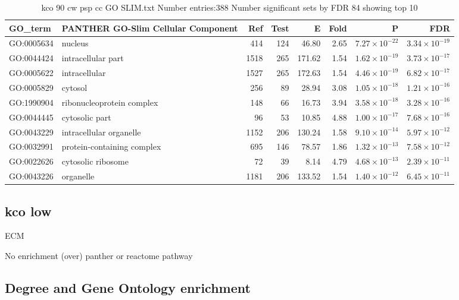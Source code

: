 \begin{table}[ht]
\centering
\begin{tabular}{llrrrrrr}
  \hline
GO\_term & PANTHER GO-Slim Cellular Component & Ref & Test & E & Fold & P & FDR \\ 
  \hline
GO:0005634 & nucleus  & 414 & 124 & 46.80 & 2.65 & $7.27 \times 10^{-22}$ & $3.34 \times 10^{-19}$ \\ 
  GO:0044424 & intracellular part  & 1518 & 265 & 171.62 & 1.54 & $1.62 \times 10^{-19}$ & $3.73 \times 10^{-17}$ \\ 
  GO:0005622 & intracellular  & 1527 & 265 & 172.63 & 1.54 & $4.46 \times 10^{-19}$ & $6.82 \times 10^{-17}$ \\ 
  GO:0005829 & cytosol  & 256 & 89 & 28.94 & 3.08 & $1.05 \times 10^{-18}$ & $1.21 \times 10^{-16}$ \\ 
  GO:1990904 & ribonucleoprotein complex  & 148 & 66 & 16.73 & 3.94 & $3.58 \times 10^{-18}$ & $3.28 \times 10^{-16}$ \\ 
  GO:0044445 & cytosolic part  & 96 & 53 & 10.85 & 4.88 & $1.00 \times 10^{-17}$ & $7.68 \times 10^{-16}$ \\ 
  GO:0043229 & intracellular organelle  & 1152 & 206 & 130.24 & 1.58 & $9.10 \times 10^{-14}$ & $5.97 \times 10^{-12}$ \\ 
  GO:0032991 & protein-containing complex  & 695 & 146 & 78.57 & 1.86 & $1.32 \times 10^{-13}$ & $7.58 \times 10^{-12}$ \\ 
  GO:0022626 & cytosolic ribosome  & 72 & 39 & 8.14 & 4.79 & $4.68 \times 10^{-13}$ & $2.39 \times 10^{-11}$ \\ 
  GO:0043226 & organelle  & 1181 & 206 & 133.52 & 1.54 & $1.40 \times 10^{-12}$ & $6.45 \times 10^{-11}$ \\ 
  \hline
\end{tabular}
\caption{kco 90 cw psp cc GO SLIM.txt Number entries:388 Number significant sets by FDR 84 showing top 10} 
\label{tab:kco 90 cw psp cc GO SLIM.txt Number entries:388 Number significant sets by FDR 84 showing top 10}
\end{table}

\subsection{kco low}
ECM

No enrichment (over) panther or reactome pathway

\subsection{Degree and Gene Ontology enrichment}

